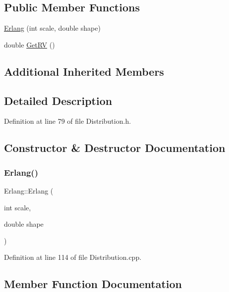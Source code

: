 \subsection*{Public Member Functions}
\begin{DoxyCompactItemize}
\item 
\hyperlink{class_erlang_a5799b0314c8400cdb318df37625de98e}{Erlang} (int scale, double shape)
\item 
double \hyperlink{class_erlang_a5ae5b56e37bd2c5ee4318fcc12259442}{Get\+RV} ()
\end{DoxyCompactItemize}
\subsection*{Additional Inherited Members}


\subsection{Detailed Description}


Definition at line 79 of file Distribution.\+h.



\subsection{Constructor \& Destructor Documentation}
\mbox{\label{class_erlang_a5799b0314c8400cdb318df37625de98e}} 
\subsubsection{\texorpdfstring{Erlang()}{Erlang()}}
{\footnotesize\ttfamily Erlang\+::\+Erlang (\begin{DoxyParamCaption}\item[{int}]{scale,  }\item[{double}]{shape }\end{DoxyParamCaption})}



Definition at line 114 of file Distribution.\+cpp.



\subsection{Member Function Documentation}
\mbox{\label{class_erlang_a5ae5b56e37bd2c5ee4318fcc12259442}} 
